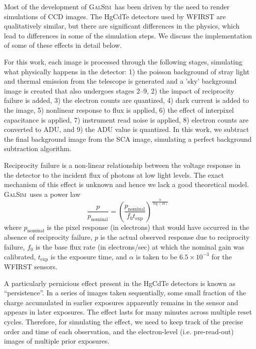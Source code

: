 \documentclass[aps,prd, amsmath,amssymb,superscriptaddress,showkeys,nofootinbib,reprint,preprintnumbers]{revtex4-1}
\newcommand{\galsim}{\textsc{GalSim}}
\begin{document}
Most of the development of \galsim\ has been driven by the need to render simulations of CCD images.
The HgCdTe detectors used by WFIRST are qualitatively similar, but there are significant differences in the physics, which lead to differences in some of the simulation steps. We discuss the implementation of some of these effects in detail below. 

For this work, each image is processed through the following stages, simulating what physically happens in the detector: 1) the poisson background of stray light and thermal emission from the telescope is generated and a 'sky' background image is created that also undergoes stages 2--9, 2) the impact of reciprocity failure is added, 3) the electron counts are quantized, 4) dark current is added to the image, 5) nonlinear response to flux is applied, 6) the effect of interpixel capacitance is applied, 7) instrument read noise is applied, 8) electron counts are converted to ADU, and 9) the ADU value is quantized. In this work, we subtract the final background image from the SCA image, simulating a perfect background subtraction algorithm.

Reciprocity failure is a non-linear relationship between the voltage response in the detector to the incident flux of photons at low light levels.
The exact mechanism of this effect is unknown and hence we lack a good theoretical model. 
\galsim\ uses a power law
\begin{equation}
\frac{p}{p_\mathrm{nominal}} =
 \left(\frac{p_\mathrm{nominal}}{f_0 t_\mathrm{exp}}\right)^{\frac{\alpha}{\log(10)}}
\end{equation}
where $p_\mathrm{nominal}$ is the pixel response (in electrons) that would have occurred in the absence of reciprocity failure,
$p$ is the actual observed response due to reciprocity failure,
$f_0$ is the base flux rate (in electrons/sec) at which the nominal gain was calibrated, 
$t_\mathrm{exp}$ is the exposure time,
and $\alpha$ is taken to be $6.5 \times 10^{-3}$ for the WFIRST sensors.

A particularly pernicious effect present in the HgCdTe detectors is known as ``persistence''.  
In a series of images taken sequentially, some small fraction of the charge accumulated in earlier exposures apparently remains in the sensor and appears in later exposures.  
The effect lasts for many minutes across multiple reset cycles.  
Therefore, for simulating the effect, we need to keep track of the precise order and time of each observation, and the electron-level (i.e. pre-read-out) images of multiple prior exposures.
\end{document}
